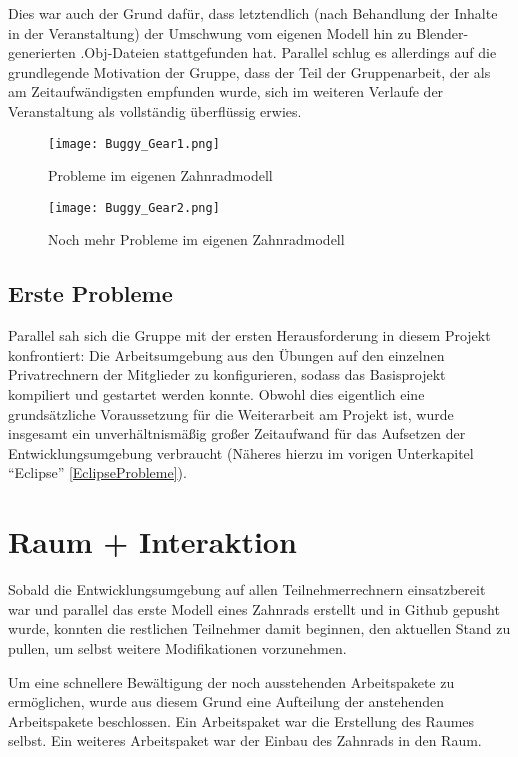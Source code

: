 \documentclass{article}
\begin{document}
Dies war auch der Grund dafür, dass letztendlich (nach Behandlung der Inhalte in der Veranstaltung) der Umschwung vom eigenen Modell hin zu Blender-generierten .Obj-Dateien stattgefunden hat. 
Parallel schlug es allerdings auf die grundlegende Motivation der Gruppe, dass der Teil der Gruppenarbeit, der als am Zeitaufwändigsten empfunden wurde, sich im weiteren Verlaufe der Veranstaltung als vollständig überflüssig erwies. 
\newpage

\begin{figure}[h!]
\centering
\texttt{[image: Buggy\_Gear1.png]}
\caption{Probleme im eigenen Zahnradmodell}
\label{fig:bugGear1}
\end{figure}

\begin{figure}[h!]
\centering
\texttt{[image: Buggy\_Gear2.png]}
\caption{Noch mehr Probleme im eigenen Zahnradmodell}
\label{fig:bugGear2}
\end{figure}

\subsection{Erste Probleme}
Parallel sah sich die Gruppe mit der ersten Herausforderung in diesem Projekt konfrontiert: 
Die Arbeitsumgebung aus den Übungen auf den einzelnen Privatrechnern der Mitglieder zu konfigurieren, sodass das Basisprojekt kompiliert und gestartet werden konnte. 
Obwohl dies eigentlich eine grundsätzliche Voraussetzung für die Weiterarbeit am Projekt ist, wurde insgesamt ein unverhältnismäßig großer Zeitaufwand für das Aufsetzen der Entwicklungsumgebung verbraucht (Näheres hierzu im vorigen Unterkapitel \enquote{Eclipse} \ref{EclipseProbleme}). 



\section{Raum + Interaktion}
Sobald die Entwicklungsumgebung auf allen Teilnehmerrechnern einsatzbereit war und parallel das erste Modell eines Zahnrads erstellt und in Github gepusht wurde, konnten die restlichen Teilnehmer damit beginnen, den aktuellen Stand zu pullen, um selbst weitere Modifikationen vorzunehmen. 

Um eine schnellere Bewältigung der noch ausstehenden Arbeitspakete zu ermöglichen, wurde aus diesem Grund eine Aufteilung der anstehenden Arbeitspakete beschlossen. 
Ein Arbeitspaket war die Erstellung des Raumes selbst. 
Ein weiteres Arbeitspaket war der Einbau des Zahnrads in den Raum. 
\end{document}
